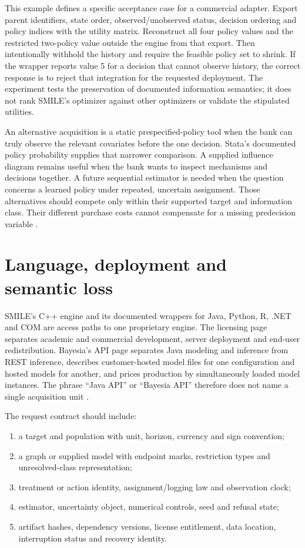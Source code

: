 This example defines a specific acceptance case for a commercial adapter.
Export parent identifiers, state order, observed/unobserved status, decision
ordering and policy indices with the utility matrix. Reconstruct all four
policy values and the restricted two-policy value outside the engine from
that export. Then intentionally withhold the history and require the feasible
policy set to shrink. If the wrapper reports value 5 for a decision that
cannot observe history, the correct response is to reject that integration
for the requested deployment. The experiment tests the preservation of
documented information semantics; it does not rank SMILE's optimizer against
other optimizers or validate the stipulated utilities.

An alternative acquisition is a static prespecified-policy tool when the bank
can truly observe the relevant covariates before the one decision. Stata's
documented policy probability supplies that narrower comparison. A supplied
influence diagram remains useful when the bank wants to inspect mechanisms
and decisions together. A future sequential estimator is needed when the
question concerns a learned policy under repeated, uncertain assignment.
Those alternatives should compete only within their supported target and
information class. Their different purchase costs cannot compensate for a
missing predecision variable \citep{exec13_ch_stata,exec16_cp_bayesfusion}.

\section{Language, deployment and semantic loss}
\label{exec17:s8-boundary}

SMILE's C++ engine and its documented wrappers for Java, Python, R, .NET and
COM are access paths to one proprietary engine. The licensing page separates
academic and commercial development, server deployment and end-user
redistribution. Bayesia's API page separates Java modeling and inference from
REST inference, describes customer-hosted model files for one configuration and
hosted models for another, and prices production by simultaneously loaded model
instances. The phrase ``Java API'' or ``Bayesia API'' therefore does not name a
single acquisition unit \citep{exec13_smile_intro,exec13_smile_license,
exec13_bayesia_api}.

The request contract should include:
\begin{enumerate}
\item a target and population with unit, horizon, currency and sign convention;
\item a graph or supplied model with endpoint marks, restriction types and
      unresolved-class representation;
\item treatment or action identity, assignment/logging law and observation clock;
\item estimator, uncertainty object, numerical controls, seed and refusal state;
\item artifact hashes, dependency versions, license entitlement, data location,
      interruption status and recovery identity.
\end{enumerate}

